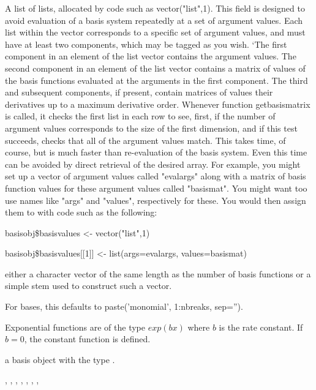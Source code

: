 \documentclass{article}
\begin{document}
\begin{Arguments}
\begin{ldescription}
\item[\code{basisvalues}] A list of lists, allocated by code such as vector("list",1).  This
field is designed to avoid evaluation of a basis system repeatedly
at a set of argument values.  Each list within the vector
corresponds to a specific set of argument values, and must have at
least two components, which may be tagged as you wish.  `The first
component in an element of the list vector contains the argument
values.  The second component in an element of the list vector
contains a matrix of values of the basis functions evaluated at the
arguments in the first component.  The third and subsequent
components, if present, contain matrices of values their derivatives
up to a maximum derivative order.  Whenever function getbasismatrix
is called, it checks the first list in each row to see, first, if
the number of argument values corresponds to the size of the first
dimension, and if this test succeeds, checks that all of the
argument values match.  This takes time, of course, but is much
faster than re-evaluation of the basis system.  Even this time can
be avoided by direct retrieval of the desired array.  For example,
you might set up a vector of argument values called "evalargs" along
with a matrix of basis function values for these argument values
called "basismat".  You might want too use names like "args" and
"values", respectively for these.  You would then assign them to
 with code such as the following:

basisobj\$basisvalues <- vector("list",1)

basisobj\$basisvalues[[1]] <- list(args=evalargs,
values=basismat)

\item[\code{names}] either a character vector of the same length as the number of basis
functions or a simple stem used to construct such a vector.

For  bases, this defaults to paste('monomial',
1:nbreaks, sep='').

\end{ldescription}
\end{Arguments}
\begin{Details}\relax
Exponential functions are of the type $exp(bx)$ where $b$
is the rate constant.  If $b = 0$, the constant function is
defined.
\end{Details}
\begin{Value}
a basis object with the type .
\end{Value}
\begin{SeeAlso}\relax
{},
,
,
,
,
,
,
\end{SeeAlso}
\end{document}
